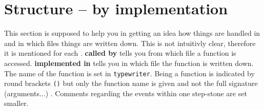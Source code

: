 \section{Structure --  by implementation}
 \label{implementation}
This section is supposed to help you in getting an idea how things are handled in \Dumux and in which files things are written down. 
This is not intuitivly clear, therefore it is mentioned for each . \textbf{called by} tells you from which file a function is 
accessed. \textbf{implemented in} tells you in which file the function is written down. The name of the function is set in \verb+typewriter+. 
Being a function is indicated by round brackets \verb+()+ but only the function name is given and not the full signature (arguments...) .
 Comments regarding the events within one step-stone are set \scriptsize{smaller}.



